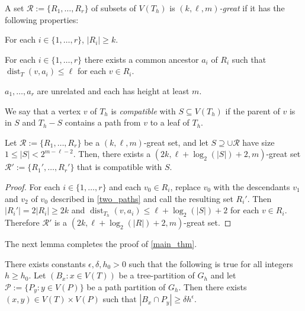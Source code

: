 \documentclass{patmorin}
\newcommand{\defin}[1]{\emph{\color{brightmaroon}#1}}
\DeclareMathOperator{\dist}{dist}
\renewcommand{\le}{\leqslant}
\renewcommand{\ge}{\geqslant}
\begin{document}
A set $\mathcal{R}:=\{R_1,\ldots,R_r\}$ of subsets of $V(T_h)$ is \defin{$(k,\ell,m)$-great} if it has the following properties:

\begin{compactenum}
  \item For each $i\in\{1,\ldots,r\}$, $|R_i|\ge k$.
  \item For each $i\in\{1,\ldots,r\}$ there exists a common ancestor $a_i$ of $R_i$ such that $\dist_T(v,a_i)\le\ell$ for each $v\in R_i$.
  \item $a_1,\ldots,a_r$ are unrelated and each has height at least $m$.
\end{compactenum}

We say that a vertex $v$ of $T_h$ is \defin{compatible} with $S\subseteq V(T_h)$ if the parent of $v$ is in $S$ and $T_h-S$ contains a path from $v$ to a leaf of $T_h$.
  

\begin{lem}\label{compatible_set}
  Let $\mathcal{R}:=\{R_1,\ldots,R_r\}$ be a $(k,\ell,m)$-great set,  and let $S\supseteq \cup\mathcal{R}$ have size $1\le |S|< 2^{m-\ell-2}$.  Then, there exists a $(2k,\ell + \log_2(|S|)+2,m)$-great set $\mathcal{R}':=\{R_1',\ldots,R_r'\}$ that is compatible with $S$.
\end{lem}

\begin{proof}
  For each $i\in\{1,\ldots,r\}$ and each $v_0\in R_i$, replace $v_0$ with the descendants $v_1$ and $v_2$ of $v_0$ described in \cref{two_paths} and call the resulting set $R_i'$.   Then $|R_i'|=2|R_i|\ge 2k$ and $\dist_{T_h}(v,a_i)\le \ell+\log_2(|S|)+2$ for each $v\in R_i$.  Therefore $\mathcal{R}'$ is a $(2k,\ell + \log_2(|R|)+2,m)$-great set.
\end{proof}

The next lemma completes the proof of \cref{main_thm}.
\begin{lem}\label{big_lemma}
  There exists constants $\epsilon,\delta, h_0 >0$ such that the following is true for all integers $h\ge h_0$. Let $(B_x:x\in V(T))$ be a tree-partition of $G_h$ and let $\mathcal{P}:=\{P_y:y\in V(P)\}$ be a path partition of $G_h$.  Then there exists $(x,y)\in V(T)\times V(P)$ such that $|B_x\cap P_y| \ge \delta h^\epsilon$.
\end{lem}
\end{document}
